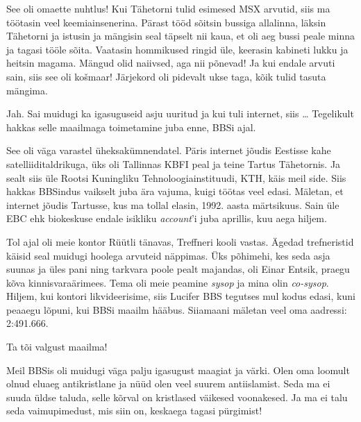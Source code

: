 See oli omaette nuhtlus! Kui Tähetorni 
tulid esimesed MSX arvutid, siis ma töötasin veel
keemiainsenerina. Pärast tööd sõitsin bussiga allalinna, läksin Tähetorni ja 
istusin ja mängisin seal täpselt nii kaua, et oli aeg bussi peale minna ja 
tagasi tööle sõita. Vaatasin hommikused ringid üle, keerasin kabineti lukku ja heitsin
magama. Mängud olid naiivsed, aga nii põnevad! Ja kui endale 
arvuti sain, siis see oli košmaar! Järjekord oli pidevalt ukse taga, kõik tulid 
tasuta mängima. 

Jah. Sai muidugi ka igasuguseid asju uuritud ja kui tuli internet, siis \ldots 
Tegelikult hakkas selle maailmaga toimetamine juba enne, BBSi ajal.


See oli väga varastel üheksakümnendatel. Päris internet jõudis Eestisse 
kahe satelliiditaldrikuga, üks oli Tallinnas KBFI peal ja teine Tartus 
Tähetornis. Ja sealt siis üle Rootsi Kuningliku 
Tehnoloogiainstituudi, KTH, käis meil 
side. Siis hakkas BBSindus vaikselt juba ära vajuma, kuigi töötas veel 
edasi. Mäletan, et internet jõudis Tartusse, kus ma tollal elasin, 
1992. aasta märtsikuus. Sain üle EBC ehk biokeskuse endale 
isikliku \emph{account}'i juba aprillis, kuu aega hiljem.

Tol ajal oli meie kontor Rüütli tänavas, Treffneri kooli vastas. Ägedad trefneristid käisid seal muidugi 
hoolega arvuteid näppimas. Üks põhimehi, kes seda asja suunas ja üles pani ning tarkvara poole pealt
majandas, oli Einar Entsik, 
praegu kõva kinnisvaraärimees. Tema oli meie peamine \emph{sysop} ja mina 
olin \emph{co-sysop}. Hiljem, kui kontori likvideerisime, siis Lucifer 
BBS tegutses mul kodus edasi, kuni peaaegu lõpuni, kui 
BBSi maailm hääbus. Siiamaani mäletan veel oma aadressi: 2:491.666.


Ta tõi valgust maailma! 

Meil BBSis oli muidugi väga palju igasugust maagiat ja värki. Olen oma 
loomult olnud eluaeg antikristlane ja nüüd olen veel suurem 
antiislamist. Seda ma ei suuda üldse taluda, selle kõrval on kristlased 
väikesed voonakesed. Ja ma ei talu seda vaimupimedust, mis siin on, keskaega tagasi pürgimist! 

